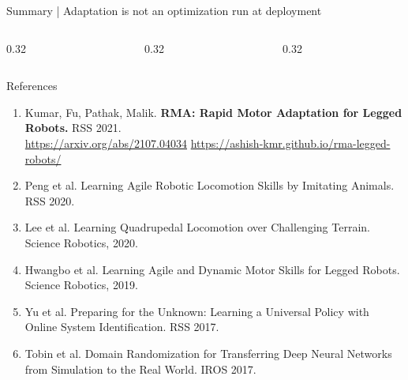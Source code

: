 \documentclass[aspectratio=169,10pt,t]{beamer}
\begin{document}
\begin{frame}{Summary | Adaptation is not an optimization run at deployment}
  \begin{columns}[T,onlytextwidth]
    \begin{column}{0.32\textwidth}
    \end{column}
    \hfill
    \begin{column}{0.32\textwidth}
    \end{column}
    \hfill
    \begin{column}{0.32\textwidth}
    \end{column}
  \end{columns}

  \vspace{0.9em}
  \centering
  \hspace{1.4em}%

\end{frame}

\begin{frame}{References}
  {\footnotesize
  \begin{enumerate}
    \item Kumar, Fu, Pathak, Malik.
      \textbf{RMA: Rapid Motor Adaptation for Legged Robots.}
      RSS 2021.\\
      \url{https://arxiv.org/abs/2107.04034}
      \quad
      \url{https://ashish-kmr.github.io/rma-legged-robots/}
    \item Peng et al. Learning Agile Robotic Locomotion Skills by Imitating Animals. RSS 2020.
    \item Lee et al. Learning Quadrupedal Locomotion over Challenging Terrain. Science Robotics, 2020.
    \item Hwangbo et al. Learning Agile and Dynamic Motor Skills for Legged Robots. Science Robotics, 2019.
    \item Yu et al. Preparing for the Unknown: Learning a Universal Policy with Online System Identification. RSS 2017.
    \item Tobin et al. Domain Randomization for Transferring Deep Neural Networks from Simulation to the Real World. IROS 2017.
  \end{enumerate}}
\end{frame}
\end{document}
